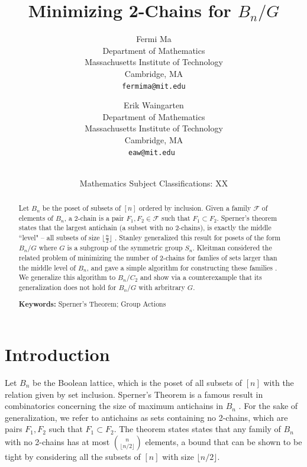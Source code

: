 \documentclass[12pt]{article}
\title{\bf Minimizing 2-Chains for $B_n/G$}
\author{
Fermi Ma\\
\small Department of Mathematics\\[-0.8ex]
\small Massachusetts Institute of Technology\\[-0.8ex]
\small Cambridge, MA\\
\small\tt fermima@mit.edu\\
\and
Erik Waingarten\\
\small Department of Mathematics\\[-0.8ex]
\small Massachusetts Institute of Technology\\[-0.8ex] 
\small Cambridge, MA\\
\small\tt eaw@mit.edu
}
\date{\dateline{August, 2014}{XX}\\
\small Mathematics Subject Classifications: XX}
\theoremstyle{plain}
\theoremstyle{definition}
\theoremstyle{remark}
\newcommand{\F}{\mathcal{F}}
\begin{document}
\maketitle


\begin{abstract}
Let $B_n$ be the poset of subsets of $[n]$ ordered by inclusion. Given a family $\F$ of elements of $B_n$, a 2-chain is a pair $F_1, F_2 \in \F$ such that $F_1 \subset F_2$. Sperner's theorem states that the largest antichain (a subset with no 2-chains), is exactly the middle ``level" -- all subsets of size $\lfloor \frac{n}{2} \rfloor$ \cite{Sperner}. Stanley generalized this result for posets of the form $B_n/G$ where $G$ is a subgroup of the symmetric group $S_n$. Kleitman considered the related problem of minimizing the number of 2-chains for famlies of sets larger than the middle level of $B_n$, and gave a simple algorithm for constructing these families \cite{Kleitman}. We generalize this algorithm to $B_n/C_2$ and show via a counterexample that its generalization does not hold for $B_n/G$ with arbritrary $G$.

  \bigskip\noindent \textbf{Keywords:} Sperner's Theorem; Group Actions\end{abstract}

\section{Introduction}

Let $B_n$ be the Boolean lattice, which is the poset of all subsets of $[n]$ with the relation given by set inclusion. Sperner's Theorem is a famous result in combinatorics concerning the size of maximum antichains in $B_n$ \cite{Sperner}. For the sake of generalization, we refer to antichains as sets containing no 2-chains, which are pairs $F_1, F_2$ such that $F_1 \subset F_2$. The theorem states states that any family of $B_n$ with no 2-chains has at most $\binom{n}{\lfloor n/2 \rfloor}$ elements, a bound that can be shown to be tight by considering all the subsets of $[n]$ with size $\lfloor n/2 \rfloor$.
\end{document}
